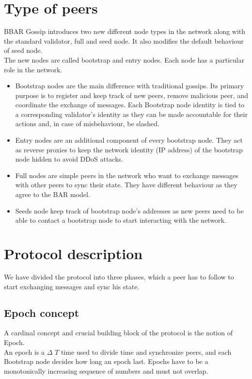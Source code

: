 \documentclass[mscthesis]{usiinfthesis}
\begin{document}
\section{Type of peers}
BBAR Gossip introduces two new different node types in the network along with the standard validator, full and seed node. It also modifies the default behaviour of seed node. \\
The new nodes are called bootstrap and entry nodes. Each node has a particular role in the network. \\
\begin{itemize}
	\item Bootstrap nodes are the main difference with traditional gossips. Its primary purpose is to register and keep track of new peers, remove malicious peer, and coordinate the exchange of messages. Each Bootstrap node identity is tied to a corresponding validator's identity as they can be made accountable for their actions and, in case of misbehaviour, be slashed.
	\item Entry nodes are an additional component of every bootstrap node. They act as reverse proxies to keep the network identity (IP address) of the bootstrap node hidden to avoid DDoS attacks.
	\item Full nodes are simple peers in the network who want to exchange messages with other peers to sync their state. They have different behaviour as they agree to the BAR model.
	\item Seeds node keep track of bootstrap node's addresses as new peers need to be able to contact a bootstrap node to start interacting with the network.
\end{itemize}

\section{Protocol description}
We have divided the protocol into three phases, which a peer has to follow to start exchanging messages and sync his state. 
\subsection{Epoch concept}
A cardinal concept and crucial building block of the protocol is the notion of Epoch.  \\
An epoch is a $\Delta$ $T$ time used to divide time and synchronize peers, and each Bootstrap node decides how long an epoch last. Epochs have to be a monotonically increasing sequence of numbers and must not overlap.
\end{document}
